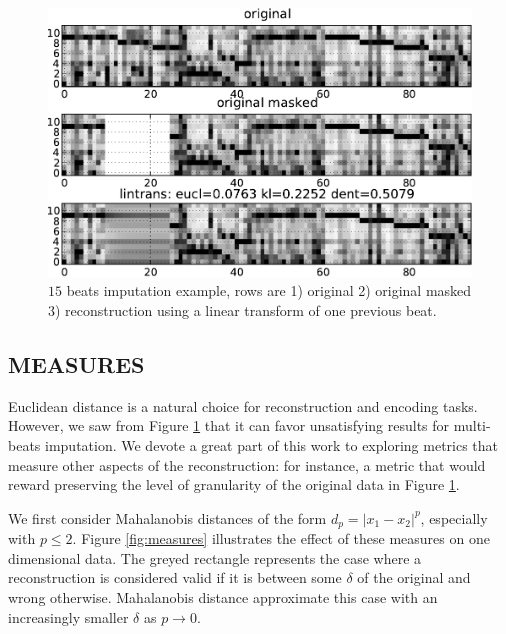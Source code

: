 \documentclass{article}
\begin{document}
\begin{figure}[t]
\begin{center}
\includegraphics[width=.95\columnwidth]{basic}
\end{center}
\caption{$15$ beats imputation example, rows are 1) original 2) original masked
3) reconstruction using a linear transform of one previous beat.
\label{fig:basic}}
\end{figure}



\subsection{MEASURES}
\label{ssec:measures}
Euclidean distance is a natural choice for reconstruction and encoding
tasks. However, we saw from Figure \ref{fig:basic} that it can favor
unsatisfying results for multi-beats imputation. We devote a great
part of this work to exploring metrics that measure other aspects of
the reconstruction: for instance, a metric that would reward
preserving the level of granularity of the original data in Figure
\ref{fig:basic}.

We first consider Mahalanobis distances of the form $d_p =
|x_1-x_2|^p$, especially with $p \leq 2$. Figure \ref{fig:measures}
illustrates the effect of these measures on one dimensional data.  The
greyed rectangle represents the case where a reconstruction is
considered valid if it is between some $\delta$ of the original and
wrong otherwise.  Mahalanobis distance approximate this case with an
increasingly smaller $\delta$ as $p \rightarrow 0$.
\end{document}
